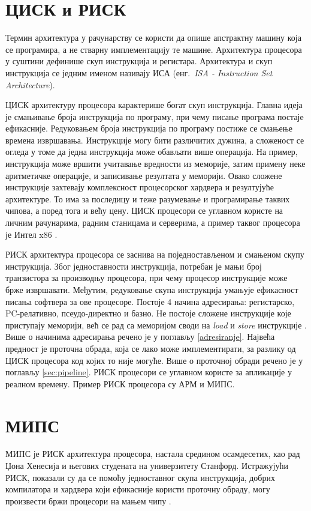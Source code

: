 \documentclass[12pt,oneside]{memoir}
\begin{document}
\section{ЦИСК и РИСК}
\label{ciscrisc}
Термин архитектура у рачунарству се користи да опише апстрактну машину која се програмира, а не стварну имплементацију те машине. Архитектура процесора у суштини дефинише скуп инструкција и регистара. Архитектура и скуп инструкција се једним именом називају ИСА (енг.~\textit{ISA - Instruction Set Architecture})\cite{isa}.

ЦИСК архитектуру процесора карактерише богат скуп инструкција. Главна идеја је смањивање броја инструкција по програму, при чему писање програма постаје ефикасније. Редуковањем броја инструкција по програму постиже се смањење времена извршавања. Инструкције могу бити различитих дужина, а сложеност се огледа у томе да једна инструкција може обављати више операција. На пример, инструкција може вршити учитавање вредности из меморије, затим примену неке аритметичке операције, и записивање резултата у меморији. Овако сложене инструкције захтевају комплексност процесорског хардвера и резултујуће архитектуре. То има за последицу и теже разумевање и програмирање таквих чипова, а поред тога и већу цену.
ЦИСК процесори се углавном користе на личним рачунарима, радним станицама и серверима, а пример таквог процесора је Интел x86 \cite{mips, risc_vs_cisc}.

РИСК архитектура процесора се заснива на поједностављеном и смањеном скупу инструкција. Због једноставности инструкција, потребан је мањи број транзистора за производњу процесора, при чему процесор инструкције може брже извршавати. Међутим, редуковање скупа инструкција умањује ефикасност писања софтвера за ове процесоре. 
Постоје 4 начина адресирања: регистарско, PC-релативно, псеудо-директно и базно. Не постоје сложене инструкције које приступају меморији, већ се рад са меморијом своди на \textit{load} и \textit{store} инструкције \cite{mips, risc_vs_cisc}. Више о начинима адресирања речено је у поглављу \ref{adresiranje}.
Највећа предност је проточна обрада, која се лако може имплементирати, за разлику од ЦИСК процесора код којих то није могуће. Више о проточној обради речено је у поглављу \ref{sec:pipeline}. РИСК процесори се углавном користе за апликације у реалном времену. Пример РИСК процесора су АРМ и МИПС.

\section{МИПС}
\label{mips}
МИПС је РИСК архитектура процесора, настала средином осамдесетих, као рад Џона Хенесија и његових студената на универзитету Станфорд. Истражујући РИСК, показали су да се помоћу једноставног скупа инструкција, добрих компилатора и хардвера који ефикасније користи проточну обраду, могу произвести бржи процесори на мањем чипу \cite{mips}.
\end{document}
